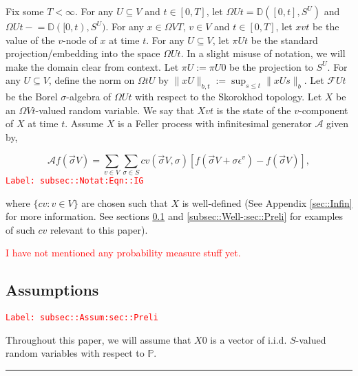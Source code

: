 \documentclass[12pt]{article}
\newcommand{\mb}{\mathbb}
\newcommand{\mc}{\mathcal}
\newcommand{\ep}{\epsilon}
\newcommand{\tr}{\textcolor{red}}
\newcommand{\labe}[1]{\tr{\texttt{Label: #1}}}
\newcommand{\ind}{\hspace{24pt}}
\newcommand{\lin}{\rule{\linewidth}{0.4 pt}}
\newcommand{\pr}{\mb{P}}							%
\newcommand{\defeq}{:=}								%
\newcommand{\cad}{\mb{D}}							%
\renewcommand{\v}{v}							%
\renewcommand{\U}{U}							%
\renewcommand{\S}{S}							%
\newcommand{\s}{\sigma}							%
\newcommand{\sv}{\vec{\s}}						%
\renewcommand{\b}{b}							%
\newcommand{\ev}[1]{\ep^{#1}}					%
\newcommand{\T}{T}								%
\newcommand{\x}{x}								%
\renewcommand{\t}{t}							%
\newcommand{\proj}{\pi}							%
\renewcommand{\tt}{s}							%
\newcommand{\F}{\mc{F}}							%
\newcommand{\X}{X}								%
\newcommand{\IG}{\mc{A}}						%
\newcommand{\IGr}{c}							%
\newcommand{\V}{V}									%
\newcommand{\XState}[1]{\S^{#1}}				%
\begin{document}
\ind Fix some \(\T < \infty\). For any \(\U\subseteq \V\) and \(\t\in [0,\T]\), let \(\Omega{\U}{\t} = \cad([0,\t],\S^{\U})\) and \(\Omega{\U}{\t-} = \cad([0,\t),\S^\U)\). For any \(\x{}{} \in \Omega{\V}{\T}\), \(\v\in \V\) and  \(\t \in [0,\T]\), let \(\x{\v}{\t}\) be the value of the \(\v\)-node of \(\x{}{}\) at time \(\t\). For any \(\U\subseteq \V\), let \(\proj{\U}{\t}\) be the standard projection/embedding into the space \(\Omega{\U}{\t}\). In a slight misuse of notation, we will make the domain clear from context. Let \(\proj{\U}{} \defeq \proj{\U}{0}\) be the projection to \(\S^\U\). For any \(\U\subseteq \V\), define the norm on \(\Omega{\t}{\U}\) by \(\|\x{\U}{}\|_{\b{},\t} \defeq \sup_{\tt \leq \t} \|\x{\U}{\tt}\|_{\b{}}\). Let \(\F{\U}{\t}\) be the Borel \(\sigma\)-algebra of \(\Omega{\U}{\t}\) with respect to the Skorokhod topology. Let \(\X{}{}\) be an \(\Omega{\V}{\t}\)-valued random variable. We say that \(\X{\v}{\t}\) is the state of the \(\v\)-component of \(\X{}{}\) at time \(\t\). Assume \(\X{}{}\) is a Feller process with infinitesimal generator \(\IG\) given by,

\begin{equation}
\IG f(\sv{}{\V}) = \sum_{\v \in \V}\sum_{\s \in \S} \IGr{\v}(\sv{}{\V},\s)[f(\sv{}{\V} + \s \ev{\v}) - f(\sv{}{\V})],
\label{subsec::Notat:Eqn::IG}
\end{equation}
\labe{subsec::Notat:Eqn::IG}

where \(\{\IGr{\v}:\v\in \V\}\) are chosen such that \(\X{}{}\) is well-defined (See Appendix \ref{sec::Infin} for more information. See sections \ref{subsec::Assum:sec::Preli} and \ref{subsec::Well-:sec::Preli} for examples of such \(\IGr{\v}\) relevant to this paper). 

\tr{I have not mentioned any probability measure stuff yet.}

\subsection{Assumptions}
\label{subsec::Assum:sec::Preli}\labe{subsec::Assum:sec::Preli}

Throughout this paper, we will assume that \(\X{}{0}\) is a vector of i.i.d. \(\S\)-valued random variables with respect to \(\pr\).

\lin
\end{document}
